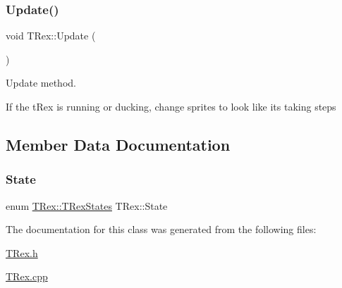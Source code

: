 \subsubsection{\texorpdfstring{Update()}{Update()}}
{\footnotesize\ttfamily void T\+Rex\+::\+Update (\begin{DoxyParamCaption}{ }\end{DoxyParamCaption})}



Update method. 

If the t\+Rex is running or ducking, change sprites to look like it\textquotesingle{}s taking steps 

\subsection{Member Data Documentation}
\mbox{\label{class_t_rex_afac420bc35ec1ba3aab6d7016285a79e}} 
\subsubsection{\texorpdfstring{State}{State}}
{\footnotesize\ttfamily enum \mbox{\hyperlink{class_t_rex_a000c4d51b41f07886af073a6b7b3e063}{T\+Rex\+::\+T\+Rex\+States}}  T\+Rex\+::\+State}



The documentation for this class was generated from the following files\+:\begin{DoxyCompactItemize}
\item 
\mbox{\hyperlink{_t_rex_8h}{T\+Rex.\+h}}\item 
\mbox{\hyperlink{_t_rex_8cpp}{T\+Rex.\+cpp}}\end{DoxyCompactItemize}
